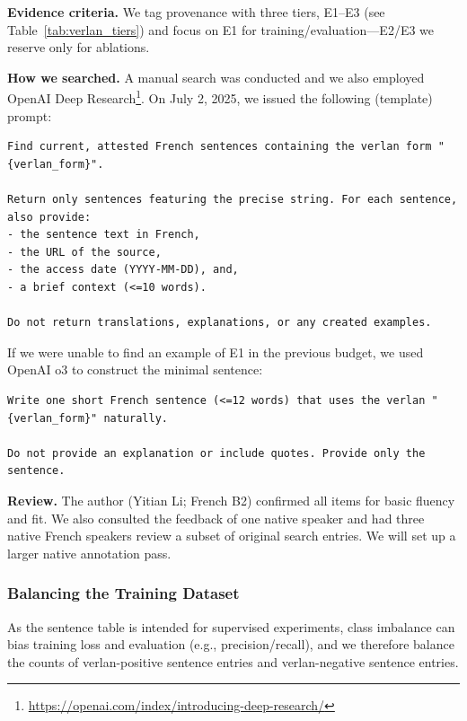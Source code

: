 \documentclass[12pt]{article}
\begin{document}
\textbf{Evidence criteria.} We tag provenance with three tiers, E1--E3 (see Table~\ref{tab:verlan_tiers}) and focus on E1 for training/evaluation—E2/E3 we reserve only for ablations.

\textbf{How we searched.} A manual search was conducted and we also employed OpenAI Deep Research\footnote{\url{https://openai.com/index/introducing-deep-research/}}. On July 2, 2025, we issued the following (template) prompt:

\begin{lstlisting}[breaklines=true, breakatwhitespace=false]
Find current, attested French sentences containing the verlan form "{verlan_form}".

Return only sentences featuring the precise string. For each sentence, also provide:
- the sentence text in French,
- the URL of the source,
- the access date (YYYY-MM-DD), and,
- a brief context (<=10 words).

Do not return translations, explanations, or any created examples.
\end{lstlisting}

If we were unable to find an example of E1 in the previous budget, we used OpenAI o3 to construct the minimal sentence:

\begin{lstlisting}[breaklines=true, breakatwhitespace=false]
Write one short French sentence (<=12 words) that uses the verlan "{verlan_form}" naturally.

Do not provide an explanation or include quotes. Provide only the sentence.
\end{lstlisting}

\textbf{Review.} The author (Yitian Li; French B2) confirmed all items for basic fluency and fit. We also consulted the feedback of one native speaker and had three native French speakers review a subset of original search entries. We will set up a larger native annotation pass.

\subsubsection{Balancing the Training Dataset}

As the sentence table is intended for supervised experiments, class imbalance can bias training loss and evaluation (e.g., precision/recall), and we therefore balance the counts of verlan-positive sentence entries and verlan-negative sentence entries.
\end{document}
